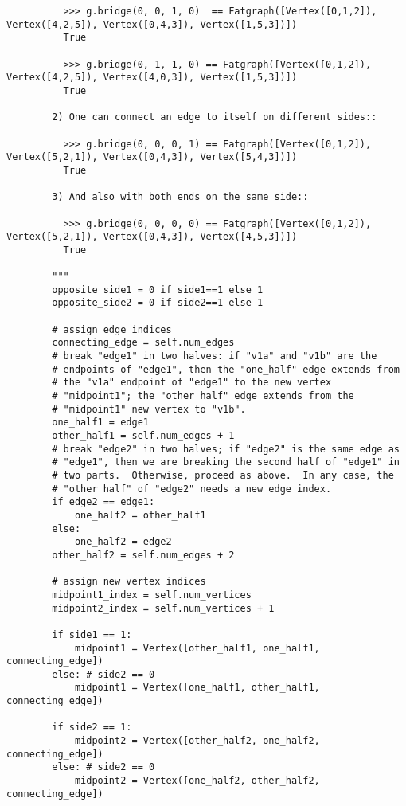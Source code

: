 \begin{lstlisting}
          >>> g.bridge(0, 0, 1, 0)  == Fatgraph([Vertex([0,1,2]), Vertex([4,2,5]), Vertex([0,4,3]), Vertex([1,5,3])])
          True
          
          >>> g.bridge(0, 1, 1, 0) == Fatgraph([Vertex([0,1,2]), Vertex([4,2,5]), Vertex([4,0,3]), Vertex([1,5,3])])
          True

        2) One can connect an edge to itself on different sides::
        
          >>> g.bridge(0, 0, 0, 1) == Fatgraph([Vertex([0,1,2]), Vertex([5,2,1]), Vertex([0,4,3]), Vertex([5,4,3])])
          True

        3) And also with both ends on the same side::
        
          >>> g.bridge(0, 0, 0, 0) == Fatgraph([Vertex([0,1,2]), Vertex([5,2,1]), Vertex([0,4,3]), Vertex([4,5,3])])
          True
          
        """
        opposite_side1 = 0 if side1==1 else 1
        opposite_side2 = 0 if side2==1 else 1

        # assign edge indices
        connecting_edge = self.num_edges
        # break "edge1" in two halves: if "v1a" and "v1b" are the
        # endpoints of "edge1", then the "one_half" edge extends from
        # the "v1a" endpoint of "edge1" to the new vertex
        # "midpoint1"; the "other_half" edge extends from the
        # "midpoint1" new vertex to "v1b".
        one_half1 = edge1
        other_half1 = self.num_edges + 1
        # break "edge2" in two halves; if "edge2" is the same edge as
        # "edge1", then we are breaking the second half of "edge1" in
        # two parts.  Otherwise, proceed as above.  In any case, the
        # "other half" of "edge2" needs a new edge index.
        if edge2 == edge1:
            one_half2 = other_half1
        else:
            one_half2 = edge2
        other_half2 = self.num_edges + 2

        # assign new vertex indices
        midpoint1_index = self.num_vertices
        midpoint2_index = self.num_vertices + 1

        if side1 == 1:
            midpoint1 = Vertex([other_half1, one_half1, connecting_edge])
        else: # side2 == 0
            midpoint1 = Vertex([one_half1, other_half1, connecting_edge])

        if side2 == 1:
            midpoint2 = Vertex([other_half2, one_half2, connecting_edge])
        else: # side2 == 0
            midpoint2 = Vertex([one_half2, other_half2, connecting_edge])


\end{lstlisting}
